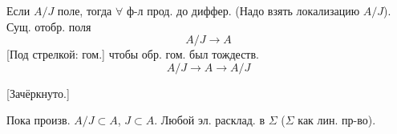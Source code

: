 Если $A/J$ поле, тогда $\forall$ ф-л прод. до диффер.
(Надо взять локализацию $A/J$).
Сущ. отобр. поля
\begin{equation*}
A/J\longrightarrow A
\end{equation*}
[Под стрелкой: гом.]
чтобы обр. гом. был тождеств.
\begin{equation*}
A/J\longrightarrow A\longrightarrow A/J
\end{equation*}
\par\noindent\begin{minipage}{\linewidth}
[Зачёркнуто.]
\end{minipage}\par
Пока произв.
$A/J\subset A$, $J\subset A$.
Любой эл. расклад. в $\Sigma$ ($\Sigma$ как лин. пр-во).

